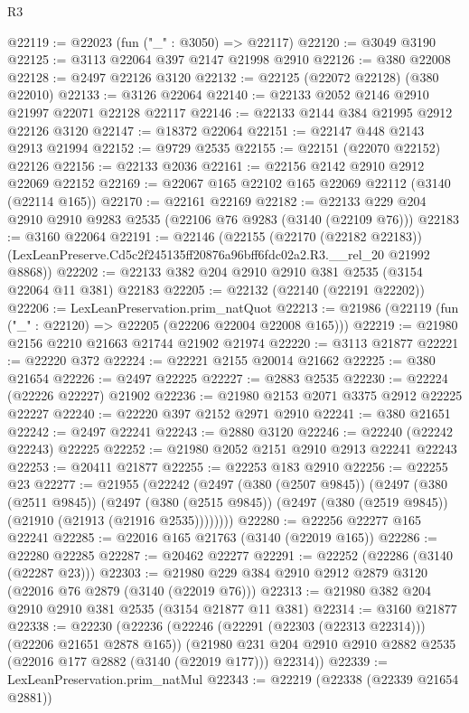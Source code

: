\begin{lexlean}{R3}
\begin{coremodule}
@22119 := @22023 (fun ("_" : @3050) => @22117)
@22120 := @3049 @3190
@22125 := @3113 @22064 @397 @2147 @21998 @2910
@22126 := @380 @22008
@22128 := @2497 @22126 @3120
@22132 := @22125 (@22072 @22128) (@380 @22010)
@22133 := @3126 @22064
@22140 := @22133 @2052 @2146 @2910 @21997 @22071 @22128 @22117
@22146 := @22133 @2144 @384 @21995 @2912 @22126 @3120
@22147 := @18372 @22064
@22151 := @22147 @448 @2143 @2913 @21994
@22152 := @9729 @2535
@22155 := @22151 (@22070 @22152) @22126
@22156 := @22133 @2036
@22161 := @22156 @2142 @2910 @2912 @22069 @22152
@22169 := @22067 @165 @22102 @165 @22069 @22112 (@3140 (@22114 @165))
@22170 := @22161 @22169
@22182 := @22133 @229 @204 @2910 @2910 @9283 @2535 (@22106 @76 @9283 (@3140 (@22109 @76)))
@22183 := @3160 @22064
@22191 := @22146
    (@22155
      (@22170 (@22182 @22183))
      (LexLeanPreserve.Cd5c2f245135ff20876a96bff6fdc02a2.R3.__rel_20 @21992 @8868))
@22202 := @22133 @382 @204 @2910 @2910 @381 @2535 (@3154 @22064 @11 @381) @22183
@22205 := @22132 (@22140 (@22191 @22202))
@22206 := LexLeanPreservation.prim_natQuot
@22213 := @21986 (@22119 (fun ("_" : @22120) => @22205 (@22206 @22004 @22008 @165)))
@22219 := @21980 @2156 @2210 @21663 @21744 @21902 @21974
@22220 := @3113 @21877
@22221 := @22220 @372
@22224 := @22221 @2155 @20014 @21662
@22225 := @380 @21654
@22226 := @2497 @22225
@22227 := @2883 @2535
@22230 := @22224 (@22226 @22227) @21902
@22236 := @21980 @2153 @2071 @3375 @2912 @22225 @22227
@22240 := @22220 @397 @2152 @2971 @2910
@22241 := @380 @21651
@22242 := @2497 @22241
@22243 := @2880 @3120
@22246 := @22240 (@22242 @22243) @22225
@22252 := @21980 @2052 @2151 @2910 @2913 @22241 @22243
@22253 := @20411 @21877
@22255 := @22253 @183 @2910
@22256 := @22255 @23
@22277 := @21955
    (@22242
      (@2497
        (@380 (@2507 @9845))
        (@2497
          (@380 (@2511 @9845))
          (@2497
            (@380 (@2515 @9845))
            (@2497 (@380 (@2519 @9845)) (@21910 (@21913 (@21916 @2535))))))))
@22280 := @22256 @22277 @165 @22241
@22285 := @22016 @165 @21763 (@3140 (@22019 @165))
@22286 := @22280 @22285
@22287 := @20462 @22277
@22291 := @22252 (@22286 (@3140 (@22287 @23)))
@22303 := @21980 @229 @384 @2910 @2912 @2879 @3120 (@22016 @76 @2879 (@3140 (@22019 @76)))
@22313 := @21980 @382 @204 @2910 @2910 @381 @2535 (@3154 @21877 @11 @381)
@22314 := @3160 @21877
@22338 := @22230
    (@22236
      (@22246 (@22291 (@22303 (@22313 @22314))) (@22206 @21651 @2878 @165))
      (@21980 @231 @204 @2910 @2910 @2882 @2535 (@22016 @177 @2882 (@3140 (@22019 @177))) @22314))
@22339 := LexLeanPreservation.prim_natMul
@22343 := @22219 (@22338 (@22339 @21654 @2881))

\end{coremodule}
\end{lexlean}
